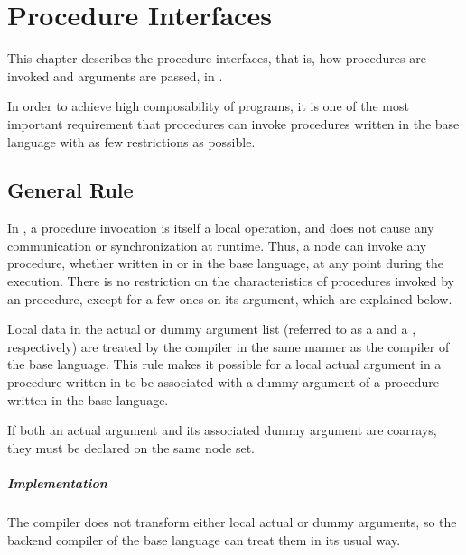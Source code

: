 \chapter{Procedure Interfaces}
\label{chap:procedure}

This chapter describes the procedure interfaces, that is, how
procedures are invoked and arguments are passed, in {\XMP}.

In order to achieve high composability of {\XMP} programs, it is one of
the most important requirement that {\XMP} procedures can invoke
procedures written in the base language with as few restrictions as
possible.


\section{General Rule}

In {\XMP}, a procedure invocation is itself a local operation, and does
not cause any communication or synchronization at runtime. Thus, a node
can invoke any procedure, whether written in {\XMP} or in the base
language, at any point during the execution.
%
There is no restriction on the characteristics of procedures invoked by
an {\XMP} procedure, except for a few ones on its argument, which are
explained below.

Local data in the actual or dummy argument list (referred to as a {\it
{}} and a {\it {}},
respectively) are treated by the {\XMP} compiler in the same manner as
the compiler of the base language.
%
This rule makes it possible for a local actual argument in a procedure
written in {\XMP} to be associated with a dummy argument of a procedure
written in the base language.

If both an actual argument and its associated dummy argument are coarrays,
they must be declared on the same node set.


\paragraph*{Implementation}

The {\XMP} compiler does not transform either local actual or dummy
arguments, so the backend compiler of the base language can treat
them in its usual way.

